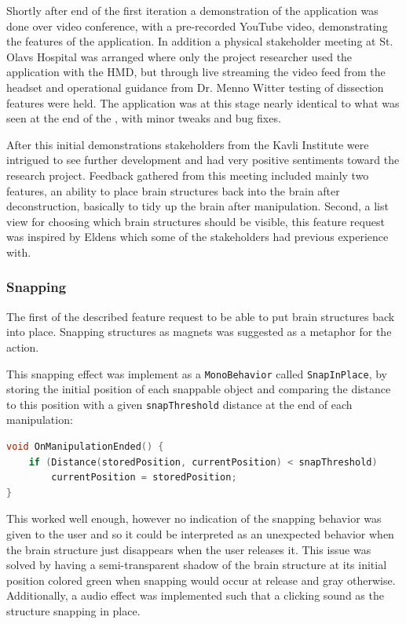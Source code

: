 Shortly after end of the first iteration a demonstration of the application was done over video conference, with a pre-recorded YouTube video, demonstrating the features of the application. In addition a physical stakeholder meeting at St. Olavs Hospital was arranged where only the project researcher used the application with the HMD, but through live streaming the video feed from the headset and operational guidance from Dr. Menno Witter testing of dissection features were held. The application was at this stage nearly identical to what was seen at the end of the , with minor tweaks and bug fixes.

After this initial demonstrations stakeholders from the Kavli Institute were intrigued to see further development and had very positive sentiments toward the research project. Feedback gathered from this meeting included mainly two features, an ability to place brain structures back into the brain after deconstruction, basically to tidy up the brain after manipulation. Second, a list view for choosing which brain structures should be visible, this feature request was inspired by Eldens  which some of the stakeholders had previous experience with.

\subsubsection*{Snapping}
The first of the described feature request to be able to put brain structures back into place. Snapping structures as magnets was suggested as a metaphor for the action. 

This snapping effect was implement as a \texttt{MonoBehavior} called \texttt{SnapInPlace}, by storing the initial position of each snappable object and comparing the distance to this position with a given \texttt{snapThreshold} distance at the end of each manipulation: 

\begin{lstlisting}[language=c]
void OnManipulationEnded() {
    if (Distance(storedPosition, currentPosition) < snapThreshold) 
        currentPosition = storedPosition; 
}
\end{lstlisting}

This worked well enough, however no indication of the snapping behavior was given to the user and so it could be interpreted as an unexpected behavior when the brain structure just disappears when the user releases it. This issue was solved by having a semi-transparent shadow of the brain structure at its initial position colored green when snapping would occur at release and gray otherwise. Additionally, a audio effect was implemented such that a clicking sound as the structure snapping in place. 

